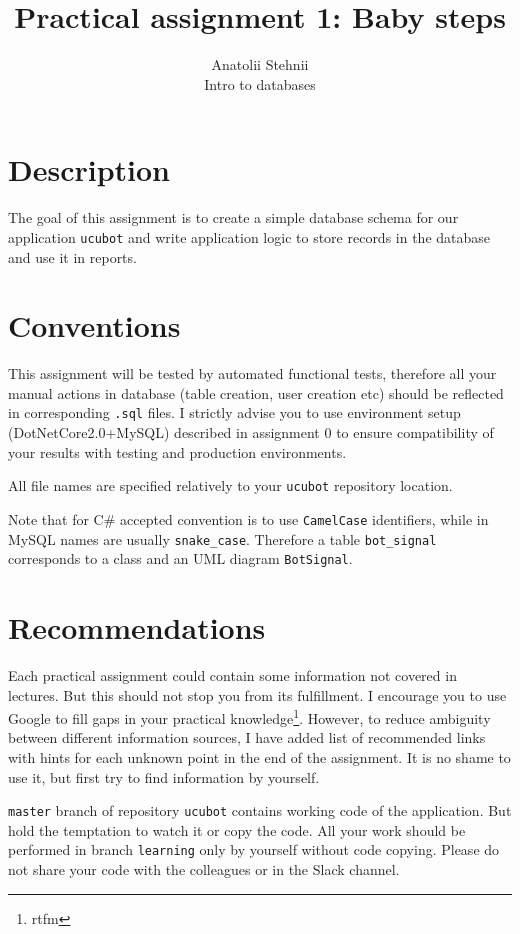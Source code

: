 \documentclass[12pt]{article}
\newcommand{\code}[1]{\texttt{#1}}
\begin{document}
\title{Practical assignment 1: Baby steps}
\author{Anatolii Stehnii\\Intro to databases}
\maketitle

\section*{Description}

The goal of this assignment is to create a simple database schema for our application \code{ucubot} and write application logic to store records in the database and use it in reports.

\section*{Conventions}

This assignment will be tested by automated functional tests, therefore all your manual actions in database (table creation, user creation etc) should be reflected in corresponding \code{.sql} files. I strictly advise you to use environment setup (DotNetCore2.0+MySQL) described in assignment 0 to ensure compatibility of your results with testing and production environments.

All file names are specified relatively to your \code{ucubot} repository location.

Note that for C\# accepted convention is to use \code{CamelCase} identifiers, while in MySQL names are usually \code{snake\_case}. Therefore a table \code{bot\_signal} corresponds to a class and an UML diagram \code{BotSignal}.

\section*{Recommendations}

Each practical assignment could contain some information not covered in lectures. But this should not stop you from its fulfillment. I encourage you to use Google to fill gaps in your practical knowledge\footnote{rtfm}. However, to reduce ambiguity between different information sources, I have added list of recommended links with hints for each unknown point in the end of the assignment. It is no shame to use it, but first try to find information by yourself.

\code{master} branch of repository \code{ucubot} contains working code of the application. But hold the temptation to watch it or copy the code. All your work should be performed in branch \code{learning} only by yourself without code copying. Please do not share your code with the colleagues or in the Slack channel.
\end{document}
